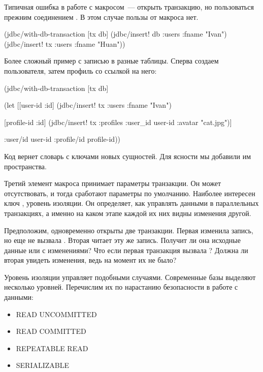 Типичная ошибка в работе с макросом~--- открыть транзакцию, но пользоваться прежним соединением . В этом случае пользы от макроса нет.

\begin{english}
  \begin{clojure/lines}
(jdbc/with-db-transaction [tx db]
  (jdbc/insert! db :users {:fname "Ivan"})
  (jdbc/insert! tx :users {:fname "Huan"}))
  \end{clojure/lines}
\end{english}

Более сложный пример с записью в разные таблицы. Сперва создаем пользователя, затем профиль со ссылкой на него:

\begin{english}
  \begin{clojure}
(jdbc/with-db-transaction [tx db]

  (let [[{user-id :id}]
        (jdbc/insert! tx :users {:fname "Ivan"})

        [{profile-id :id}]
        (jdbc/insert! tx :profiles
                      {:user_id user-id
                       :avatar "cat.jpg"})]

    {:user/id user-id
     :profile/id profile-id}))
  \end{clojure}
\end{english}

Код вернет словарь с ключами новых сущностей. Для ясности мы добавили им пространства.

Третий элемент макроса принимает параметры транзакции. Он может отсутствовать, и тогда сработают параметры по умолчанию. Наиболее интересен ключ , уровень изоляции. Он определяет, как управлять данными в параллельных транзакциях, а именно на каком этапе каждой их них видны изменения другой.

Предположим, одновременно открыты две транзакции. Первая изменила запись, но еще не вызвала . Вторая читает эту же запись. Получит ли она исходные данные или с изменениями? Что если первая транзакция вызвала ? Должна ли вторая увидеть изменения, ведь на момент  их не было?

Уровень изоляции управляет подобными случаями. Современные базы выделяют несколько уровней. Перечислим их по нарастанию безопасности в работе с данными:

\begin{itemize}

\item
  READ UNCOMMITTED

\item
  READ COMMITTED

\item
  REPEATABLE READ

\item
  SERIALIZABLE

\end{itemize}

